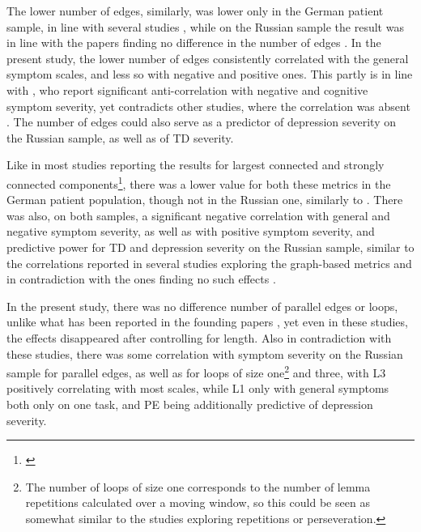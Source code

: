 The lower number of edges, similarly, was lower only in the German patient sample, in line with several studies \citep{mota2014graph, mota2016quantifying, mota2017thought, nikzad2022does}, while on the Russian sample the result was in line with the papers finding no difference in the number of edges \citep{mota2012speech, nettekoven2023semantic}. In the present study, the lower number of edges consistently correlated with the general symptom scales, and less so with negative and positive ones. This partly is in line with \citet{mota2014graph}, who report significant anti-correlation with negative and cognitive symptom severity, yet contradicts other studies, where the correlation was absent \citep{mota2012speech, nettekoven2023semantic}. The number of edges could also serve as a predictor of depression severity on the Russian sample, as well as of TD severity.

Like in most studies reporting the results for largest connected and strongly connected components\footnote{\cite{mota2014graph, mota2016quantifying, mota2017thought, spencer2021lower, morgan2021natural, nikzad2022does}}, there was a lower value for both these metrics in the German patient population, though not in the Russian one, similarly to \citet{mota2012speech}. There was also, on both samples, a significant negative correlation with general and negative symptom severity, as well as with positive symptom severity, and predictive power for TD and depression severity on the Russian sample, similar to the correlations reported in several studies exploring the graph-based metrics \citep{morgan2021natural, spencer2021lower, nikzad2022does} and in contradiction with the ones finding no such effects \citep{mota2012speech, argolo2023burnishing, nettekoven2023semantic}. 

In the present study, there was no difference number of parallel edges or loops, unlike what has been reported in the founding papers \citep{mota2012speech, mota2014graph}, yet even in these studies, the effects disappeared after controlling for length. Also in contradiction with these studies, there was some correlation with symptom severity on the Russian sample for parallel edges, as well as for loops of size one\footnote{The number of loops of size one corresponds to the number of lemma repetitions calculated over a moving window, so this could be seen as somewhat similar to the studies exploring repetitions or perseveration.} and three, with L3 positively correlating with most scales, while L1 only with general symptoms both only on one task, and PE being additionally predictive of depression severity.

